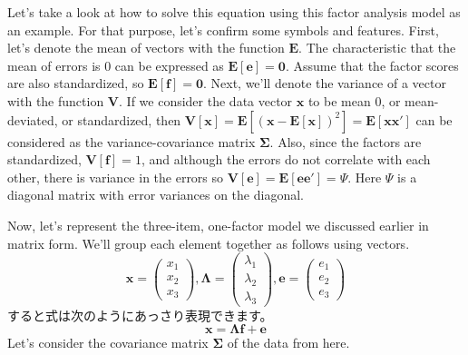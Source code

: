 \documentclass{ltjsbook}
\begin{document}
Let's take a look at how to solve this equation using this factor analysis model as an example. For that purpose, let's confirm some symbols and features. First, let's denote the mean of vectors with the function $\bm{E}$. The characteristic that the mean of errors is 0 can be expressed as $\bm{E} \left[ \bm{e} \right] = \bm{0}$. Assume that the factor scores are also standardized, so $\bm{E} \left[ \bm{f}\right] = \bm{0}$. Next, we'll denote the variance of a vector with the function $\bm{V}$. If we consider the data vector $\bm{x}$ to be mean 0, or mean-deviated, or standardized, then $\bm{V} \left [ \bm{x} \right] =\bm{E} \left[ ( \bm{x} - \bm{E}\left[ \bm{x} \right] )^2 \right ] = \bm{E} \left [ \bm{xx'}\right]$ can be considered as the variance-covariance matrix $\bm{\Sigma}$. Also, since the factors are standardized, $\bm{V}\left [ \bm{f} \right ] = 1$, and although the errors do not correlate with each other, there is variance in the errors so $\bm{V}\left[ \bm{e} \right]=\bm{E} \left[ \bm{ee'}\right] = \Psi$. Here $\Psi$ is a diagonal matrix with error variances on the diagonal.

Now, let's represent the three-item, one-factor model we discussed earlier in matrix form. We'll group each element together as follows using vectors.
\[ \bm{x} = \begin{pmatrix} x_1\\x_2\\x_3 \end{pmatrix}, \bm{\Lambda} = \begin{pmatrix} \lambda_1\\ \lambda_2 \\ \lambda_3 \end{pmatrix}, \bm{e} = \begin{pmatrix} e_1 \\ e_2 \\ e_3 \end{pmatrix} \]
すると式は次のようにあっさり表現できます。
\[ \bm{x} = \bm{\Lambda} \bm{f} + \bm{e} \]
Let's consider the covariance matrix $\bm{\Sigma}$ of the data from here.
\end{document}
